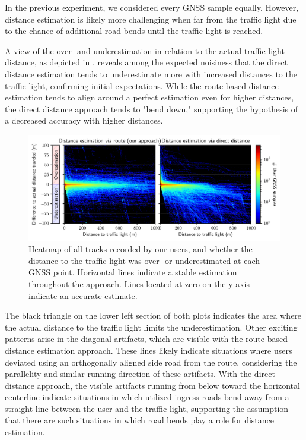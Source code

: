 In the previous experiment, we considered every GNSS sample equally. However, distance estimation is likely more challenging when far from the traffic light due to the chance of additional road bends until the traffic light is reached. 

A view of the over- and underestimation in relation to the actual traffic light distance, as depicted in , reveals among the expected noisiness that the direct distance estimation tends to underestimate more with increased distances to the traffic light, confirming initial expectations. While the route-based distance estimation tends to align around a perfect estimation even for higher distances, the direct distance approach tends to "bend down," supporting the hypothesis of a decreased accuracy with higher distances. 

\begin{figure}[t]
\centering 
\includegraphics[width=\linewidth]{images/routing-distance-scatter.pdf}
\caption{Heatmap of all tracks recorded by our users, and whether the distance to the traffic light was over- or underestimated at each GNSS point. Horizontal lines indicate a stable estimation throughout the approach. Lines located at zero on the y-axis indicate an accurate estimate.}
\label{fig:routing-distance-scatter}
\end{figure}

The black triangle on the lower left section of both plots indicates the area where the actual distance to the traffic light limits the underestimation. Other exciting patterns arise in the diagonal artifacts, which are visible with the route-based distance estimation approach. These lines likely indicate situations where users deviated using an orthogonally aligned side road from the route, considering the parallelity and similar running direction of these artifacts. With the direct-distance approach, the visible artifacts running from below toward the horizontal centerline indicate situations in which utilized ingress roads bend away from a straight line between the user and the traffic light, supporting the assumption that there are such situations in which road bends play a role for distance estimation.

